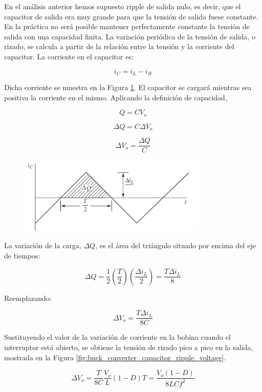 

En el análisis anterior hemos supuesto ripple de salida nulo, es decir, que el capacitor de salida era muy grande para que la tensión
de salida fuese constante. En la práctica no será posible mantener perfectamente constante la
tensión de salida con una capacidad finita. La variación periódica de la tensión de salida, o rizado,
se calcula a partir de la relación entre la tensión y la corriente del capacitor. 
La corriente en el capacitor es:

$$ i_C=i_L-i_R $$

Dicha corriente se muestra en la Figura \ref{fig:buck_converter_capacitor_current}.
El capacitor se cargará mientras sea positiva la corriente en el mismo. Aplicando la definición de capacidad,

$$ Q=CV_o $$

$$ \Delta Q=C\Delta V_o $$

$$ \Delta V_o=\frac{\Delta Q}{C} $$

\begin{figure}[ht]
    \centering
    \includegraphics[width=0.8\textwidth]{../images/hart/buck_converter_capacitor_current.png}
    \caption{}
    \label{fig:buck_converter_capacitor_current}
\end{figure}

La variación de la carga, $\Delta Q$, es el área del triángulo situado por encima del eje de tiempos:

$$ \Delta Q=\frac{1}{2}\left(\frac{T}{2}\right)\left(\frac{\Delta i_L}{2}\right)=\frac{T\Delta i_L}{8} $$

Reemplazando:

$$ \Delta V_o=\frac{T\Delta i_L}{8C} $$

Sustituyendo el valor de la variación de corriente en la bobina cuando el interruptor está abierto, 
se obtiene la tensión de rizado pico a pico en la salida, mostrada en la Figura \ref{fig:buck_converter_capacitor_ripple_voltage}.

$$ \Delta V_o=\frac{T}{8C}\frac{V_o}{L}(1-D)T=\frac{V_o(1-D)}{8LCf^2} $$

